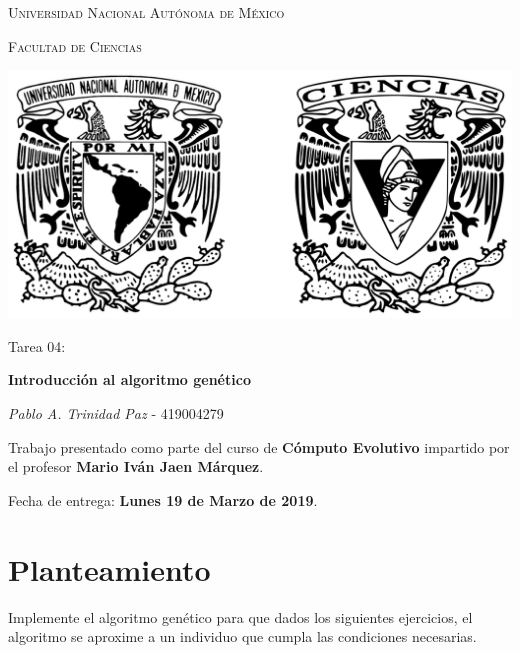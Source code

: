 \documentclass[10pt,letterpaper]{article}
\begin{document}
\begin{titlepage}
    \centering

    {\scshape\LARGE Universidad Nacional Autónoma de México \par}

    \vspace{1cm}
    {\scshape\Large Facultad de Ciencias\par}
    \vspace{1.5cm}

    \begin{center}
        \includegraphics[scale=.1]{../../assets/img/logo.png}
    \end{center}

    \vspace{.8 cm}

    {\LARGE Tarea 04: \par}
    {\huge\bfseries Introducción al algoritmo genético \par}

    \vspace{0.5cm}
    \large{\itshape{Pablo A. Trinidad Paz}} \small{ - 419004279}

    \vfill

    Trabajo presentado como parte del curso de
    \textbf{Cómputo Evolutivo}
    impartido por el profesor \textbf{Mario Iván Jaen Márquez}. \par
    \vspace{0.5cm}
    Fecha de entrega: \textbf{Lunes 19 de Marzo de 2019}.
\end{titlepage}

\section{Planteamiento}
Implemente el algoritmo genético para que dados los siguientes ejercicios,
el algoritmo se aproxime a un individuo que cumpla las condiciones necesarias.
\end{document}
